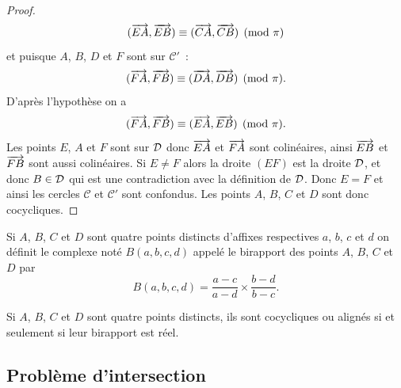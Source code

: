 \begin{proof}
\begin{equation}
  (\overrightarrow{EA},\overrightarrow{EB}) \equiv (\overrightarrow{CA},\overrightarrow{CB}) \pmod {\pi}  
\end{equation}
et puisque \(A\), \(B\), \(D\) et \(F\) sont sur \(\mathcal{C}'\)~:
\begin{equation}
  (\overrightarrow{FA},\overrightarrow{FB}) \equiv (\overrightarrow{DA},\overrightarrow{DB}) \pmod {\pi}.
\end{equation}
D'après l'hypothèse on a 
\begin{equation}
(\overrightarrow{FA},\overrightarrow{FB}) \equiv (\overrightarrow{EA},\overrightarrow{EB}) \pmod {\pi}.
\end{equation}
Les points \(E\), \(A\) et \(F\) sont sur \(\mathcal{D}\) donc \(\overrightarrow{EA}\) et \(\overrightarrow{FA}\) sont colinéaires, ainsi \(\overrightarrow{EB}\) et \(\overrightarrow{FB}\) sont aussi colinéaires. Si \(E \neq F\) alors la droite \((EF)\) est la droite \(\mathcal{D}\), et donc \(B \in \mathcal{D}\) qui est une contradiction avec la définition de \(\mathcal{D}\). Donc \(E=F\) et ainsi les cercles \(\mathcal{C}\) et \(\mathcal{C}'\) sont confondus. Les points \(A\), \(B\), \(C\) et \(D\) sont donc cocycliques.
\end{proof}
\begin{defdef}[Birapport]
  Si \(A\), \(B\), \(C\) et \(D\) sont quatre points distincts d'affixes respectives \(a\), \(b\), \(c\) et \(d\) on définit le complexe noté \(B(a,b,c,d)\) appelé le birapport des points \(A\), \(B\), \(C\) et \(D\) par
  \begin{equation}
    B(a,b,c,d)=\frac{a-c}{a-d} \times \frac{b-d}{b-c}.
  \end{equation}
\end{defdef}
\begin{theo}
  Si \(A\), \(B\), \(C\) et \(D\) sont quatre points distincts, ils sont cocycliques ou alignés si et seulement si leur birapport est réel.
\end{theo}

\subsection{Problème d'intersection}
